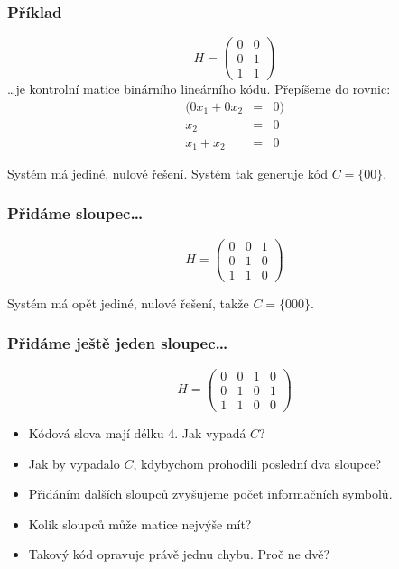 \documentclass{beamer}
\newenvironment{itemizey}%
  {\large \begin{itemize}%
    \setlength{\itemsep}{6pt}%
    \setlength{\parskip}{6pt}}%
  {\end{itemize}}
\begin{document}
\begin{frame}[t,fragile]\frametitle{Příklad} 
$$
H=\begin{pmatrix}
0&0\\
0&1\\
1&1
\end{pmatrix}
$$
\dots je kontrolní matice binárního lineárního kódu. Přepíšeme do rovnic:
\begin{eqnarray*}
(0x_1+0x_2&=&0)\\
x_2&=&0\\
x_1+x_2&=&0
\end{eqnarray*}

Systém má jediné, nulové řešení. Systém tak generuje kód $C=\{00\}$.
\end{frame}


\begin{frame}[t,fragile]\frametitle{Přidáme sloupec\dots} 
$$
H=\begin{pmatrix}
0&0&1\\
0&1&0\\
1&1&0
\end{pmatrix}
$$

Systém má opět jediné, nulové řešení, takže $C=\{000\}$.
\end{frame}


\begin{frame}[t,fragile]\frametitle{Přidáme ještě jeden sloupec\dots} 
$$
H=\begin{pmatrix}
0&0&1&0\\
0&1&0&1\\
1&1&0&0
\end{pmatrix}
$$

\begin{itemizey}
    \item Kódová slova mají délku 4. Jak vypadá $C$? 
    \item Jak by vypadalo $C$, kdybychom prohodili poslední dva sloupce?
    \item Přidáním dalších sloupců zvyšujeme počet informačních symbolů.
    \item Kolik sloupců může matice nejvýše mít?
    \item Takový kód opravuje právě jednu chybu. Proč ne dvě?
\end{itemizey}
\end{frame}
\end{document}
